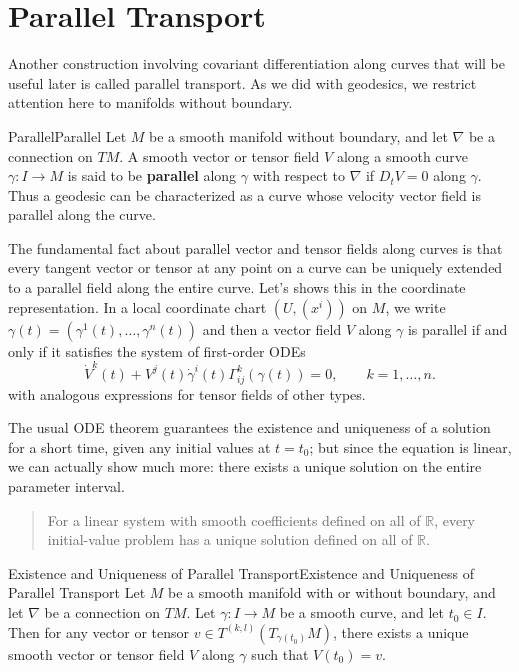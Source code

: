 \documentclass[../main.tex]{subfiles}
\begin{document}
\section{Parallel Transport}
Another construction involving covariant differentiation along curves that will be useful later is called parallel transport. As we did with geodesics, we restrict attention here to manifolds without boundary.

\begin{definition}{Parallel}{Parallel}
	Let $M$ be a smooth manifold without boundary, and let $\nabla$ be a connection on $TM$. A smooth vector or tensor field $V$ along a smooth curve $\gamma: I \to M$ is said to be \textbf{parallel} along $\gamma$ with respect to $\nabla$ if $D_t V = 0$ along $\gamma$. Thus a geodesic can be characterized as a curve whose velocity vector field is parallel along the curve.
\end{definition}

The fundamental fact about parallel vector and tensor fields along curves is that every tangent vector or tensor at any point on a curve can be uniquely extended to a parallel field along the entire curve. Let's shows this in the coordinate representation. In a local coordinate chart $(U, (x^i))$ on $M$, we write $\gamma(t) = (\gamma^1(t), \ldots, \gamma^n(t))$ and then a vector field $V$ along $\gamma$ is parallel if and only if it satisfies the system of first-order ODEs
\begin{equation}
	\dot{V}^k(t) + V^j(t) \dot{\gamma}^i(t) \Gamma_{ij}^k(\gamma(t)) = 0, \qquad k = 1, \ldots, n.
\end{equation}
with analogous expressions for tensor fields of other types. 

The usual ODE theorem guarantees the existence and uniqueness of a solution for a short time, given any initial values at $t=t_0$; but since the equation is linear, we can actually show much more: there exists a unique solution on the entire parameter interval. 

\begin{quote}
	For a linear system with smooth coefficients defined on all of $\mathbb{R}$, every initial-value problem has a unique solution defined on all of $\mathbb{R}$.
\end{quote}

\begin{theorem}{Existence and Uniqueness of Parallel Transport}{Existence and Uniqueness of Parallel Transport}
	Let $M$ be a smooth manifold with or without boundary, and let $\nabla$ be a connection on $TM$. Let $\gamma: I \to M$ be a smooth curve, and let $t_0 \in I$. Then for any vector or tensor $v \in T^{(k, l)}(T_{\gamma(t_0)} M)$, there exists a unique smooth vector or tensor field $V$ along $\gamma$ such that $V(t_0) = v$.
\end{theorem}
\end{document}
